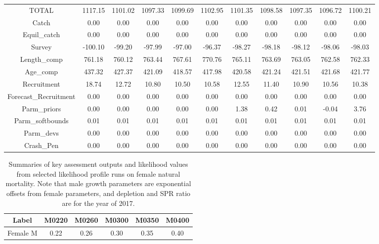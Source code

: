\documentclass[12pt,]{article}
\begin{document}
\begin{landscape}
\begin{table}[ht]
\begin{tabular}{c|ccccc|ccccc}
  TOTAL & 1117.15 & 1101.02 & 1097.33 & 1099.69 & 1102.95 & 1101.35 & 1098.58 & 1097.35 & 1096.72 & 1100.21 \\ 
  Catch & 0.00 & 0.00 & 0.00 & 0.00 & 0.00 & 0.00 & 0.00 & 0.00 & 0.00 & 0.00 \\ 
  Equil\_catch & 0.00 & 0.00 & 0.00 & 0.00 & 0.00 & 0.00 & 0.00 & 0.00 & 0.00 & 0.00 \\ 
  Survey & -100.10 & -99.20 & -97.99 & -97.00 & -96.37 & -98.27 & -98.18 & -98.12 & -98.06 & -98.03 \\ 
  Length\_comp & 761.18 & 760.12 & 763.44 & 767.61 & 770.76 & 765.11 & 763.69 & 763.05 & 762.58 & 762.33 \\ 
  Age\_comp & 437.32 & 427.37 & 421.09 & 418.57 & 417.98 & 420.58 & 421.24 & 421.51 & 421.68 & 421.77 \\ 
  Recruitment & 18.74 & 12.72 & 10.80 & 10.50 & 10.58 & 12.55 & 11.40 & 10.90 & 10.56 & 10.38 \\ 
  Forecast\_Recruitment & 0.00 & 0.00 & 0.00 & 0.00 & 0.00 & 0.00 & 0.00 & 0.00 & 0.00 & 0.00 \\ 
  Parm\_priors & 0.00 & 0.00 & 0.00 & 0.00 & 0.00 & 1.38 & 0.42 & 0.01 & -0.04 & 3.76 \\ 
  Parm\_softbounds & 0.01 & 0.01 & 0.01 & 0.01 & 0.01 & 0.01 & 0.01 & 0.01 & 0.01 & 0.01 \\ 
  Parm\_devs & 0.00 & 0.00 & 0.00 & 0.00 & 0.00 & 0.00 & 0.00 & 0.00 & 0.00 & 0.00 \\ 
  Crash\_Pen & 0.00 & 0.00 & 0.00 & 0.00 & 0.00 & 0.00 & 0.00 & 0.00 & 0.00 & 0.00 \\ 
   \hline
\end{tabular}
\end{table}
\begin{table}[ht]
\centering
\caption{Summaries of key assessment outputs 
                                              and likelihood values from selected 
                                              likelihood profile runs on female 
                                              natural mortality.  Note that male 
                                              growth parameters are exponential 
                                              offsets from female parameters, and 
                                              depletion and SPR ratio are for the year of 2017.} 
\label{tab:like_profiles}
\begin{tabular}{c|ccccc}
  \hline
Label & M0220 & M0260 & M0300 & M0350 & M0400 \\ 
  \hline
Female M & 0.22 & 0.26 & 0.30 & 0.35 & 0.40 \\ 

\end{tabular}
\end{table}
\end{landscape}
\end{document}
